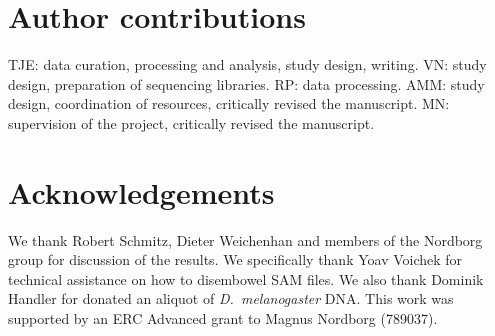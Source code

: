 \documentclass[10pt,letterpaper]{article}
\begin{document}
\section*{Author contributions}

TJE: data curation, processing and analysis, study design, writing.
VN: study design, preparation of sequencing libraries.
RP: data processing.
AMM: study design, coordination of resources, critically revised the manuscript.
MN: supervision of the project, critically revised the manuscript.

\section*{Acknowledgements}

We thank Robert Schmitz, Dieter Weichenhan and members of the Nordborg group for discussion of the results.
We specifically thank Yoav Voichek for technical assistance on how to disembowel SAM files.
We also thank Dominik Handler for donated an aliquot of \emph{D.~melanogaster} DNA.
This work was supported by an ERC Advanced grant to Magnus Nordborg (789037).

\nolinenumbers

% 
\end{document}

